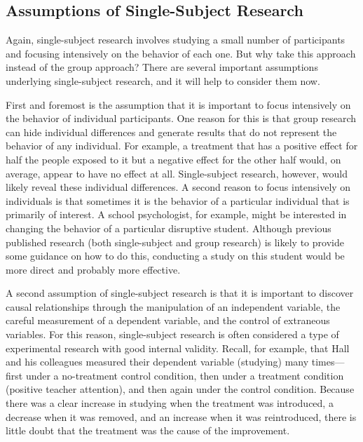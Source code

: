 \documentclass[
]{krantz}
\begin{document}
\hypertarget{assumptions-of-single-subject-research}{%
\subsection*{Assumptions of Single-Subject Research}\label{assumptions-of-single-subject-research}}


Again, single-subject research involves studying a small number of participants and focusing intensively on the behavior of each one. But why take this approach instead of the group approach? There are several important assumptions underlying single-subject research, and it will help to consider them now.

First and foremost is the assumption that it is important to focus intensively on the behavior of individual participants. One reason for this is that group research can hide individual differences and generate results that do not represent the behavior of any individual. For example, a treatment that has a positive effect for half the people exposed to it but a negative effect for the other half would, on average, appear to have no effect at all. Single-subject research, however, would likely reveal these individual differences. A second reason to focus intensively on individuals is that sometimes it is the behavior of a particular individual that is primarily of interest. A school psychologist, for example, might be interested in changing the behavior of a particular disruptive student. Although previous published research (both single-subject and group research) is likely to provide some guidance on how to do this, conducting a study on this student would be more direct and probably more effective.

A second assumption of single-subject research is that it is important to discover causal relationships through the manipulation of an independent variable, the careful measurement of a dependent variable, and the control of extraneous variables. For this reason, single-subject research is often considered a type of experimental research with good internal validity. Recall, for example, that Hall and his colleagues measured their dependent variable (studying) many times---first under a no-treatment control condition, then under a treatment condition (positive teacher attention), and then again under the control condition. Because there was a clear increase in studying when the treatment was introduced, a decrease when it was removed, and an increase when it was reintroduced, there is little doubt that the treatment was the cause of the improvement.
\end{document}

